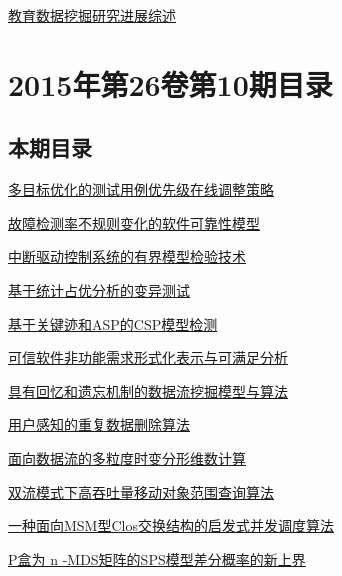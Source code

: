 \documentclass[a4paper]{article}
\begin{document}
\href{http://www.jos.org.cn/ch/reader/download_pdf.aspx?file_no=4887&year_id=2015&quarter_id=11&falg=1}{教育数据挖掘研究进展综述}


\section{\textbf{2015年第26卷第10期目录}}
\subsection{本期目录}
\href{http://www.jos.org.cn/ch/reader/download_pdf.aspx?file_no=4745&year_id=2015&quarter_id=10&falg=1}{多目标优化的测试用例优先级在线调整策略}

\href{http://www.jos.org.cn/ch/reader/download_pdf.aspx?file_no=4746&year_id=2015&quarter_id=10&falg=1}{故障检测率不规则变化的软件可靠性模型}

\href{http://www.jos.org.cn/ch/reader/download_pdf.aspx?file_no=4790&year_id=2015&quarter_id=10&falg=1}{中断驱动控制系统的有界模型检验技术}

\href{http://www.jos.org.cn/ch/reader/download_pdf.aspx?file_no=4749&year_id=2015&quarter_id=10&falg=1}{基于统计占优分析的变异测试}

\href{http://www.jos.org.cn/ch/reader/download_pdf.aspx?file_no=4738&year_id=2015&quarter_id=10&falg=1}{基于关键迹和ASP的CSP模型检测}

\href{http://www.jos.org.cn/ch/reader/download_pdf.aspx?file_no=4813&year_id=2015&quarter_id=10&falg=1}{可信软件非功能需求形式化表示与可满足分析}

\href{http://www.jos.org.cn/ch/reader/download_pdf.aspx?file_no=4747&year_id=2015&quarter_id=10&falg=1}{具有回忆和遗忘机制的数据流挖掘模型与算法}

\href{http://www.jos.org.cn/ch/reader/download_pdf.aspx?file_no=4795&year_id=2015&quarter_id=10&falg=1}{用户感知的重复数据删除算法}

\href{http://www.jos.org.cn/ch/reader/download_pdf.aspx?file_no=4806&year_id=2015&quarter_id=10&falg=1}{面向数据流的多粒度时变分形维数计算}

\href{http://www.jos.org.cn/ch/reader/download_pdf.aspx?file_no=4809&year_id=2015&quarter_id=10&falg=1}{双流模式下高吞吐量移动对象范围查询算法}

\href{http://www.jos.org.cn/ch/reader/download_pdf.aspx?file_no=4739&year_id=2015&quarter_id=10&falg=1}{一种面向MSM型Clos交换结构的启发式并发调度算法}

\href{http://www.jos.org.cn/ch/reader/download_pdf.aspx?file_no=4743&year_id=2015&quarter_id=10&falg=1}{P盒为 n -MDS矩阵的SPS模型差分概率的新上界}
\end{document}
